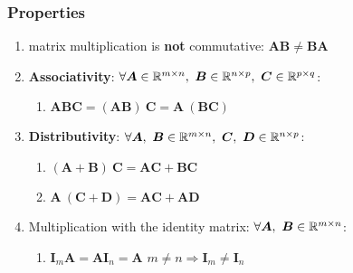 \subsubsection{Properties}

\begin{enumerate}
    \item matrix multiplication is \textbf{not} commutative: $\bm{AB} \neq \bm{BA}$
    \hfill \cite{mfml/book/mml/Deisenroth-Faisal-Ong}

    \item \textbf{Associativity}:
    $
        \forall
        \bm{A} \in \mathbb{R}^{m\times n},\
        \bm{B} \in \mathbb{R}^{n\times p},\
        \bm{C} \in \mathbb{R}^{p\times q}
    $:

        \begin{enumerate}
            \item $\bm{ABC} = (\bm{AB})\ \bm{C} = \bm{A}\ (\bm{BC})$
            \hfill \cite{mfml/book/mml/Deisenroth-Faisal-Ong}
        \end{enumerate}

    \item \textbf{Distributivity}:
    $
        \forall
        \bm{A},\ \bm{B}\in \mathbb{R}^{m\times n},\
        \bm{C},\ \bm{D}\in \mathbb{R}^{n\times p}
    $:

        \begin{enumerate}
            \item $(\bm{A} + \bm{B})\ \bm{C} = \bm{AC} + \bm{BC}$
            \hfill \cite{mfml/book/mml/Deisenroth-Faisal-Ong}

            \item $\bm{A}\ (\bm{C} + \bm{D}) = \bm{AC} + \bm{AD}$
            \hfill \cite{mfml/book/mml/Deisenroth-Faisal-Ong}
        \end{enumerate}

    \item Multiplication with the identity matrix:
    $
        \forall
        \bm{A},\ \bm{B}\in \mathbb{R}^{m\times n}
    $:
        \begin{enumerate}
            \item $\bm{I}_m\bm{A} = \bm{AI}_n = \bm{A}$
            \hfill $m\neq n \Rightarrow \bm{I}_m \neq \bm{I}_n$
            \hfill \cite{mfml/book/mml/Deisenroth-Faisal-Ong}
        \end{enumerate}
\end{enumerate}















